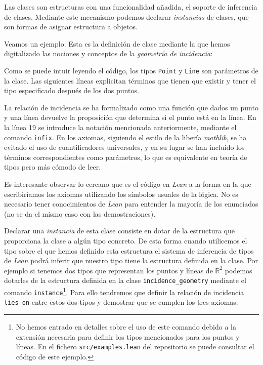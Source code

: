 Las clases son estructuras con una funcionalidad añadida, el soporte de
inferencia de clases. Mediante este mecanismo podemos declarar
\textit{instancias} de clases, que son formas de asignar estructura a objetos.

Veamos un ejemplo. Esta es la definición de clase mediante la que hemos
digitalizado las nociones y conceptos de la \textit{geometría de incidencia}:


Como se puede intuir leyendo el código, los tipos \lstinline{Point} y
\lstinline{Line} son parámetros de la clase. Las siguientes líneas explicitan
términos que tienen que existir y tener el tipo especificado después de los dos
puntos.

La relación de incidencia se ha formalizado como una función que dados un punto
y una línea devuelve la proposición que determina si el punto está en la línea.
En la línea 19 se introduce la notación mencionada anteriormente, mediante el
comando \lstinline{infix}. En los axiomas, siguiendo el estilo de la libería
\textit{mathlib}, se ha evitado el uso de cuantificadores universales, y en su
lugar se han incluido los términos correspondientes como parámetros, lo que es
equivalente en teoría de tipos pero más cómodo de leer.

Es interesante observar lo cercano que es el código en \textit{Lean} a la forma
en la que escribiríamos los axiomas utilizando los símbolos usuales de la
lógica. No es necesario tener conocimientos de \textit{Lean} para entender la
mayoría de los enunciados (no se da el mismo caso con las demostraciones).

Declarar una \textit{instancia} de esta clase consiste en dotar de la estructura
que proporciona la clase a algún tipo concreto. De esta forma cuando utilicemos
el tipo sobre el que hemos definido esta estructura el sistema de inferencia de
tipos de \textit{Lean} podrá inferir que nuestro tipo tiene la estructura
definida en la clase. Por ejemplo si tenemos dos tipos que representan los
puntos y líneas de $\mathbb{R}^2$ podemos dotarles de la estructura definida en la clase
\lstinline{incidence_geometry} mediante el comando
\lstinline{instance}\footnote{No hemos entrado en detalles sobre el uso de este
comando debido a la extensión necesaria para definir los tipos mencionados para los puntos y
líneas. En el fichero \texttt{src/examples.lean} del repositorio se puede
consultar el código de este ejemplo.}. Para ello tendremos que definir la
relación de incidencia \lstinline{lies_on} entre estos dos tipos y demostrar que
se cumplen los tres axiomas.

